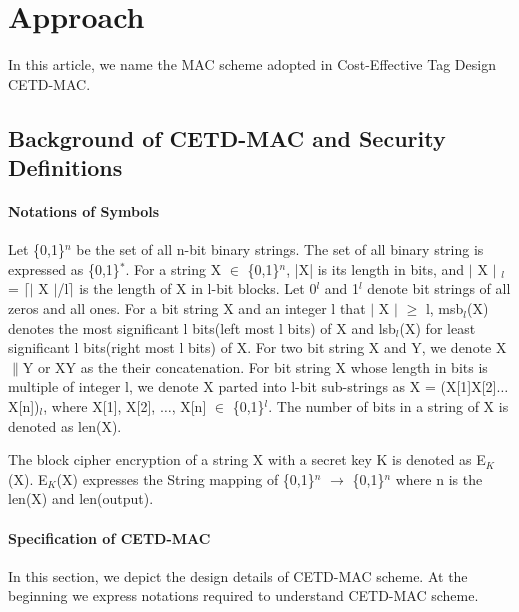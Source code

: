 \documentclass{article}
\begin{document}
\section{Approach}
In this article, we name the MAC scheme adopted in Cost-Effective Tag Design\cite{} CETD-MAC. 
\subsection{Background of CETD-MAC and Security Definitions}
\paragraph{Notations of Symbols}
Let \{0,1\}$^n$ be the set of all n-bit binary strings. The set of all binary string is expressed as \{0,1\}$^*$.  
For a string X $\in$ \{0,1\}$^n$, |X| is its length in bits, and $\vert$ X $\vert$ $_l$ = $\lceil$$\vert$ X $\vert$/l$\rceil$ is the length of X in l-bit blocks.  Let 0$^l$ and 1$^l$ denote bit strings of all zeros and all ones. 
For a bit string X and an integer l that $\vert$ X $\vert$ $\geq$ l, msb$_l$(X) denotes the most significant l bits(left most l bits) of X and lsb$_l$(X) for least significant l bits(right most l bits) of X.
For two bit string X and Y, we denote X$\|$Y  or XY as the their concatenation. For bit string X whose length in bits is multiple of integer l, we denote X parted into l-bit sub-strings as X = (X[1]X[2]$\ldots$X[n])$_l$, where X[1], X[2], $\ldots$, X[n] $\in$ \{0,1\}$^l$.
The number of bits in a string of X is denoted as len(X).

The block cipher encryption of a string X with a secret key K is denoted as E$_K$(X). E$_K$(X) expresses the String mapping of \{0,1\}$^n$ $\rightarrow$ \{0,1\}$^n$ where n is the len(X) and len(output).

\paragraph{Specification of CETD-MAC}
In this section, we depict the design details of CETD-MAC scheme. At the beginning we express notations required to understand CETD-MAC scheme. 
\end{document}
